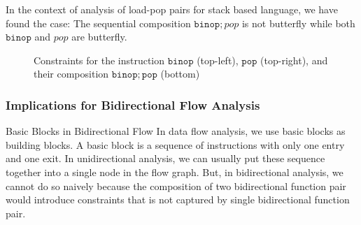 \documentclass{beamer}
\newcommand{\opt}{\mathbf{o}}
\newcommand{\mnd}{\mathbf{m}}
\newcommand{\binop}{\mathtt{binop}}
\newcommand{\pop}{\mathtt{pop}}
\begin{document}
\begin{frame} [fragile]
  In the context of analysis of load-pop pairs for stack based language,
  we have found the case: The sequential composition $\binop; pop$ is not butterfly while both $\binop$ and $pop$ are butterfly.
  \begin{figure}

  \caption{Constraints for the instruction $\binop$ (top-left), $\pop$ (top-right), and their composition $\binop;\pop$ (bottom) }
  \end{figure}
\end{frame}


\begin{frame}
  \frametitle{Implications for Bidirectional Flow Analysis}
  \begin{block}{Basic Blocks in Bidirectional Flow}
    In data flow analysis, we use basic blocks as building blocks. A basic block is a sequence of instructions with only one entry and one exit. In unidirectional analysis, we can usually put these sequence together into a single node in the flow graph. But, in bidirectional analysis, we cannot do so naively because the composition of two bidirectional function pair would introduce constraints that is not captured by single bidirectional function pair.
  \end{block}
\end{frame}
\end{document}
